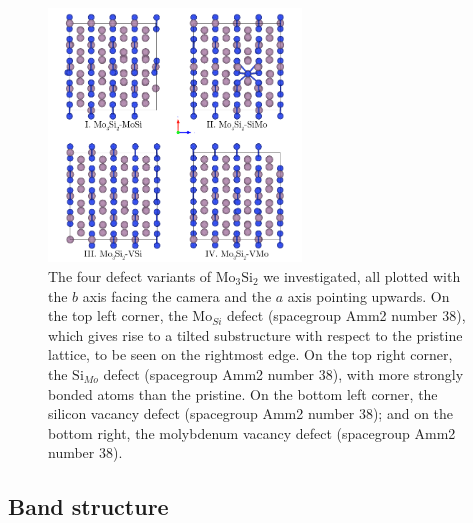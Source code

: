 \documentclass[12pt]{article}
\theoremstyle{plain}
\theoremstyle{definition}
\newcommand{\<}{\langle}
\renewcommand{\>}{\rangle}
\begin{document}
\begin{figure}
\label{fig:mo3si2-defects-b}
\centering
\includegraphics[width=0.6\textwidth]{img/Mo3Si2-defects-b}
\caption{The four defect variants of $\text{Mo}_3\text{Si}_2$ we investigated, all plotted with the $b$ axis facing the camera and the $a$ axis pointing upwards. On the top left corner, the $\text{Mo}_{Si}$ defect (spacegroup Amm2 number 38), which gives rise to a tilted substructure with respect to the pristine lattice, to be seen on the rightmost edge. On the top right corner, the $\text{Si}_{Mo}$ defect (spacegroup Amm2 number 38), with more strongly bonded atoms than the pristine. On the bottom left corner, the silicon vacancy defect (spacegroup Amm2 number 38); and on the bottom right, the molybdenum vacancy defect (spacegroup Amm2 number 38).}
\end{figure}

\clearpage

\subsection{Band structure}
\end{document}
